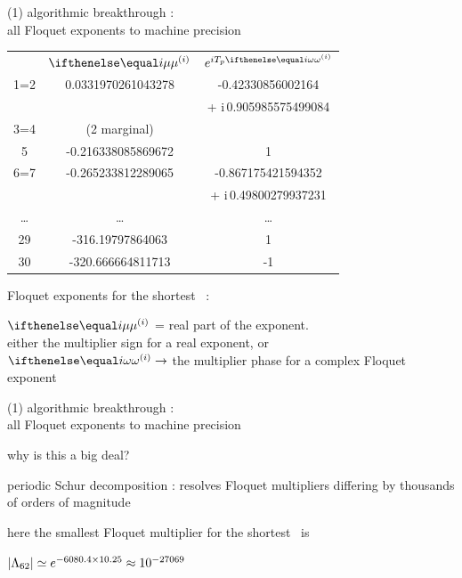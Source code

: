 \begin{frame}{(1) algorithmic breakthrough : \\
            all Floquet exponents to machine precision}
\begin{center}
\small
\begin{tabular}{  c | c | c| } %

	&  \large{$\eigRe[i]$ }  &\large{$e^{iT_{p}\eigIm[i]}$}   \\
  1=2  & 0.0331970261043278   & -0.42330856002164    \\
	& 			  & + i\,0.905985575499084 \\
  3=4  & (2 marginal) &                          \\
	5  & -0.216338085869672   & 1                         \\
  6=7  & -0.265233812289065   & -0.867175421594352   \\
	& 			  & + i\,0.49800279937231   \\
	\dots & \dots  & \dots                   \\
	29 & -316.19797864063     & 1                         \\
	30 & -320.666664811713    & -1                        \\
	\end{tabular}
	\end{center}
\bigskip

Floquet exponents for the shortest \ppo\ :

\bigskip

$\eigRe[i]$ = real part of the exponent.
\\
either
the multiplier sign for a real exponent, or
\\
$\eigIm[i] \to $
the multiplier phase for a complex Floquet exponent
\end{frame}

\begin{frame}{(1) algorithmic breakthrough : \\
            all Floquet exponents to machine precision}

why is this a big deal?
\bigskip

periodic Schur decomposition : resolves
Floquet multipliers differing by thousands of orders {of magnitude}

\medskip

here the smallest Floquet multiplier
for the shortest \po\ is
\begin{block}{}
\begin{center}
$|\Lambda_{62}| \simeq e^{-6080.4\times 10.25} \approx 10^{-27069}$
\end{center}
\end{block}
\end{frame}


